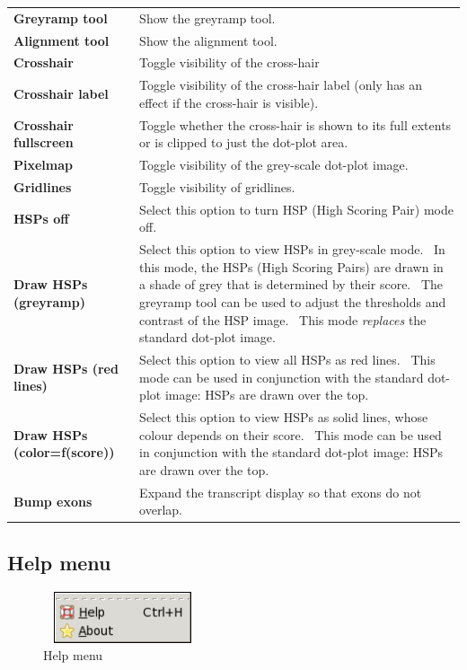 \documentclass{report}
\begin{document}
\begin{center}
\tablehead{}
\begin{supertabular}{p{2.649cm}p{10.858cm}}
\bfseries Greyramp tool &
 Show the greyramp tool.\\
\bfseries Alignment tool &
 Show the alignment tool.\\
\bfseries Crosshair &
 Toggle visibility of the cross-hair\\
\bfseries Crosshair label &
 Toggle visibility of the cross-hair label (only
has an effect if the cross-hair is visible).\\
\bfseries Crosshair fullscreen &
 Toggle whether the cross-hair is shown to its
full extents or is clipped to just the dot-plot area.\\
\bfseries Pixelmap &
 Toggle visibility of the grey-scale dot-plot
image.\\
\bfseries Gridlines &
 Toggle visibility of gridlines.\\
\bfseries HSPs off &
 Select this option to turn HSP (High Scoring
Pair) mode off.\\
\bfseries Draw HSPs (greyramp) &
 Select this option to view HSPs in grey-scale
mode. \ In this mode, the HSPs (High Scoring Pairs) are drawn in a
shade of grey that is determined by their score. \ The greyramp tool
can be used to adjust the thresholds and contrast of the HSP image.
\ This mode \textit{replaces} the standard dot-plot image.\\
\bfseries Draw HSPs (red lines) &
 Select this option to view all HSPs as red
lines. \ This mode can be used in conjunction with the standard
dot-plot image: HSPs are drawn over the top.\\
\bfseries Draw HSPs (color=f(score)) &
 Select this option to view HSPs as solid lines,
whose colour depends on their score. \ This mode can be used in
conjunction with the standard dot-plot image: HSPs are drawn over the
top.\\
\bfseries Bump exons &
 Expand the transcript display so that exons do
not overlap.\\
\end{supertabular}
\end{center}

{ \color[rgb]{0.30980393,0.5058824,0.7411765}\subsection[Help menu]{Help menu}}

\begin{figure}
 \centering
 \color[rgb]{0.30980393,0.5058824,0.7411765}
 \includegraphics[width=4.68cm,height=1.51cm]{img_menu_help.png}
 \caption{Help menu}
\end{figure}
\end{document}
